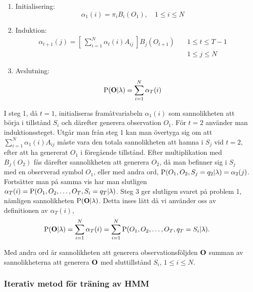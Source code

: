 \documentclass[../rapport_MVEX01-11-05]{subfiles}
\begin{document}
\begin{enumerate}
\item Initialisering:
\begin{equation*}
\alpha_1(i) = \pi_iB_i(O_1), \quad 1\leq i \leq N
\end{equation*}

\item Induktion:
\begin{align*}
\alpha_{t+1}(j) =
\left[~\sum_{i=1}^N\alpha_t(i)A_{ij}~\right]B_j(O_{t+1}) \quad &1 \leq t \leq T-1 \\
&1 \leq j \leq N
\end{align*}

\item Avslutning:
\begin{equation*}
\mathrm{P}(\mathbf{O}|\lambda) = \sum_{i=1}^N\alpha_T(i)
\end{equation*}
\end{enumerate}

I steg 1, då $t=1$, initialiseras framåtvariabeln $\alpha_1(i)$ som
sannolikheten att börja i tillstånd $S_i$ och därefter generera
observation $O_1$. För $t=2$ använder man induktionssteget. Utgår man
från steg 1 kan man övertyga sig om att
$\sum_{i=1}^N\alpha_1(i)A_{ij}$ måste vara den totala sannolikheten
att hamna i $S_j$ vid $t=2$, efter att ha genererat $O_1$ i föregående
tillstånd. Efter multiplikation med $B_j(O_{2})$ fås därefter
sannolikheten att generera $O_2$, då man befinner sig i $S_j$ med en
observerad symbol $O_1$, eller med andra ord, $\mathrm{P}(O_1,O_2,S_j
= q_2 | \lambda) = \alpha_2(j)$. Fortsätter man på samma vis har man
slutligen $\alpha_T(i) = \mathrm{P}(O_1,O_2,\dots,O_T,S_i = q_T |
\lambda)$. Steg 3 ger slutligen svaret på problem 1, nämligen
sannolikheten $\mathrm{P}(\mathbf{O}|\lambda)$. Detta inses lätt då vi
använder oss av definitionen av $\alpha_T(i)$, 
\begin{equation*}
\mathrm{P}(\mathbf{O}|\lambda) = \sum_{i=1}^N\alpha_T(i) =
\sum_{i=1}^N\mathrm{P}(O_1,O_2,\dots,O_T,q_T = S_i|\lambda). 
\end{equation*} 

Med andra ord är sannolikheten att generera observationsföljden
$\mathbf{O}$ summan av sannolikheterna att generera $\mathbf{O}$ med
sluttillstånd $S_i$, $1 \leq i \leq N$.

\subsubsection{Iterativ metod för träning av HMM}
\end{document}
